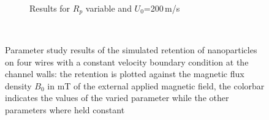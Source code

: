 \begin{figure}[H]
\begin{subfigure}{0.49\textwidth}
                 \caption{Results for $R_{p}$ variable and $U_{0}$=200\,\textmu m/s}\label{subfig:fw_constBC_Rp_var}
        \end{subfigure}
        \\
        
          \caption[Parameter study results of the simulated retention of nanoparticles on four wires with a constant velocity boundary condition at the channel walls]{Parameter study results of the simulated retention of nanoparticles on four wires with a constant velocity boundary condition at the channel walls: the retention is plotted against the magnetic flux density $B_{0}$ in mT of the external applied magnetic field, the colorbar indicates the values of the varied parameter while the other parameters where held constant}
        \label{fig:fw_param_res_constBC}
  \end{figure}
        

